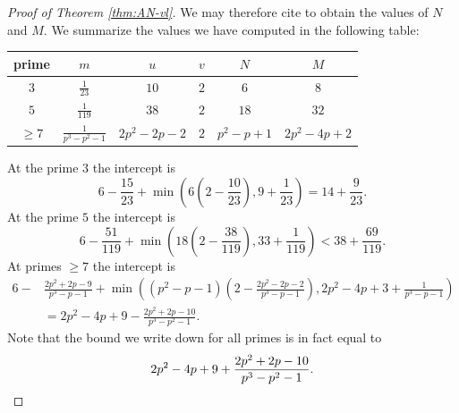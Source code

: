 \begin{proof}[Proof of Theorem \ref{thm:AN-vl}]
    We may therefore cite  to obtain the values of $N$ and $M$. We summarize the values we have computed in the following table:
  \renewcommand{\arraystretch}{1.6}
  \begin{center}
    \begin{tabular}{|c||c|c|c|c|c|}\hline
      prime  & $m$ & $u$ & $v$ & $N$ & $M$ \\\hline\hline
      $3$ & $\frac{1}{23}$ & $10$ & $2$ & $6$ & $8$ \\\hline
      $5$   & $\frac{1}{119}$ & $38$ & $2$ & $18$ & $32$ \\\hline
      $\geq 7$ & $\frac{1}{p^3 - p^2 - 1}$ & $2p^2-2p-2$ & $2$ & $p^2-p+1$ & $2p^2-4p+2$ \\\hline
    \end{tabular}
  \end{center}
  \renewcommand{\arraystretch}{1.0}
  At the prime $3$ the intercept is
  $$ 6 - \frac{15}{23} + \min \left(6\left( 2 - \frac{10}{23} \right), 9 + \frac{1}{23} \right) = 14 + \frac{9}{23}. $$
  At the prime $5$ the intercept is
  $$ 6 - \frac{51}{119} + \min \left(18 \left( 2 - \frac{38}{119} \right), 33 + \frac{1}{119} \right) < 38 + \frac{69}{119}. $$
  At primes $\geq 7$ the intercept is
  \begin{align*}
    6 - &\frac{2p^2+2p-9}{p^3 - p - 1} + \min \left((p^2 - p -1) \left( 2 - \frac{2p^2 - 2p - 2}{p^3 - p -1} \right), 2p^2 - 4p + 3 + \frac{1}{p^3 - p - 1} \right) \\
    &= 2p^2 - 4p + 9 - \frac{2p^2+2p-10}{p^3 - p^2 -1}.
  \end{align*}
  Note that the bound we write down for all primes is in fact equal to
  \[2p^2 - 4p + 9 + \frac{2p^2+2p-10}{p^3 - p^2 -1}. \qedhere\]
\end{proof}


